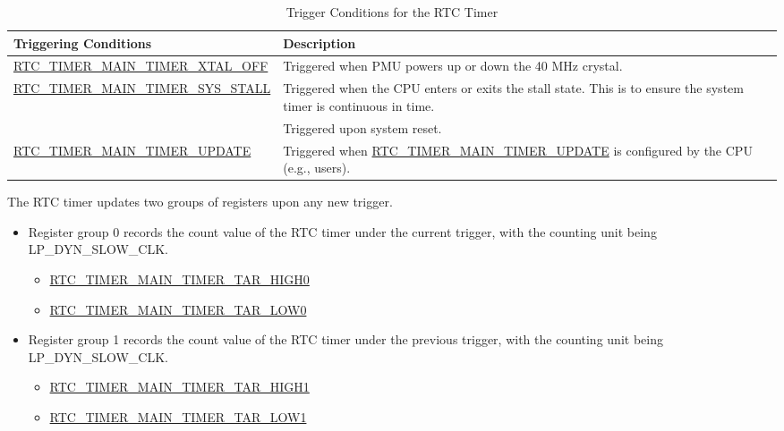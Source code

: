 \documentclass[main\_\_EN.tex]{subfiles}
\begin{document}
\begin{longtable}[c]{|p{6cm}|p{9cm}|}
    \caption{Trigger Conditions for the RTC Timer} \label{tab:lowpowm-Update-RTC-TIMER-VALUE}
    \\\hline
    \rowcolor{lightgray}
    \textbf{Triggering Conditions} & \textbf{Description} \\
    \hline
    \hyperref[fielddesc:RTCTIMERMAINTIMERXTALOFF]{RTC\_TIMER\_MAIN\_TIMER\_XTAL\_OFF} & Triggered when PMU powers up or down the 40 MHz crystal.\\
    \hline
    \multirow{2}{*}{\hyperref[fielddesc:RTCTIMERMAINTIMERSYSSTALL]{RTC\_TIMER\_MAIN\_TIMER\_SYS\_STALL}} & Triggered when the CPU enters or exits the stall state. This is to ensure the system timer is continuous in time. \\
    \hline
    \hyperref[fielddesc:RTCTIMERMAINTIMERSYSRST]{RTC\_TIMER\_MAIN\_TIMER\_SYS\_RST} & Triggered upon system reset.\\
    \hline

    \multirow{2}{*}{\hyperref[fielddesc:RTCTIMERMAINTIMERUPDATE]{RTC\_TIMER\_MAIN\_TIMER\_UPDATE}} & Triggered when \hyperref[fielddesc:RTCTIMERMAINTIMERUPDATE]{RTC\_TIMER\_MAIN\_TIMER\_UPDATE} is configured by the CPU (e.g., users).\\
    \hline
\end{longtable}

The RTC timer updates two groups of registers upon any new trigger.

\begin{itemize}
    \item Register group 0 records the count value of the RTC timer under the current trigger, with the counting unit being LP\_DYN\_SLOW\_CLK.
    \begin{itemize}
        \item \hyperref[fielddesc:RTCTIMERMAINTIMERTARHIGH0]{RTC\_TIMER\_MAIN\_TIMER\_TAR\_HIGH0}
        \item \hyperref[fielddesc:RTCTIMERMAINTIMERTARLOW0]{RTC\_TIMER\_MAIN\_TIMER\_TAR\_LOW0}
    \end{itemize}
    \item Register group 1 records the count value of the RTC timer under the previous trigger, with the counting unit being LP\_DYN\_SLOW\_CLK.
    \begin{itemize}
    \item \hyperref[fielddesc:RTCTIMERMAINTIMERTARHIGH1]{RTC\_TIMER\_MAIN\_TIMER\_TAR\_HIGH1}
    \item \hyperref[fielddesc:RTCTIMERMAINTIMERTARLOW1]{RTC\_TIMER\_MAIN\_TIMER\_TAR\_LOW1}
    \end{itemize}
\end{itemize}
\end{document}
